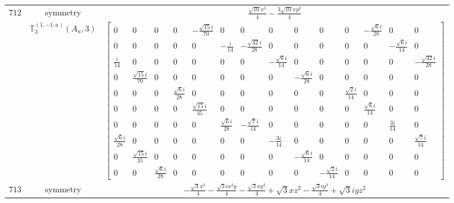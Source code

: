 \documentclass[fleqn,8pt,landscape]{jsarticle}
\begin{document}
\begin{longtable}{ccc}
$ 712 $ & $ \text{symmetry} $ & $ \frac{\sqrt{10} x^{3}}{4} - \frac{3 \sqrt{10} x y^{2}}{4} $ \\
$  $ & $ \mathbb{T}_{3}^{(1,-1;a)}(A_{u},3) $ & $ \begin{bmatrix} 0 & 0 & 0 & 0 & - \frac{\sqrt{15} i}{70} & 0 & 0 & 0 & 0 & 0 & 0 & - \frac{\sqrt{6} i}{28} & 0 & 0 \\ 0 & 0 & 0 & 0 & 0 & - \frac{i}{14} & - \frac{\sqrt{42} i}{28} & 0 & 0 & 0 & 0 & 0 & - \frac{\sqrt{6} i}{14} & 0 \\ \frac{i}{14} & 0 & 0 & 0 & 0 & 0 & 0 & - \frac{\sqrt{6} i}{14} & 0 & 0 & 0 & 0 & 0 & - \frac{\sqrt{42} i}{28} \\ 0 & \frac{\sqrt{15} i}{70} & 0 & 0 & 0 & 0 & 0 & 0 & - \frac{\sqrt{6} i}{28} & 0 & 0 & 0 & 0 & 0 \\ 0 & 0 & 0 & \frac{\sqrt{6} i}{28} & 0 & 0 & 0 & 0 & 0 & 0 & \frac{\sqrt{2} i}{14} & 0 & 0 & 0 \\ 0 & 0 & 0 & 0 & \frac{\sqrt{15} i}{35} & 0 & 0 & 0 & 0 & 0 & 0 & \frac{\sqrt{6} i}{14} & 0 & 0 \\ 0 & 0 & 0 & 0 & 0 & \frac{\sqrt{6} i}{28} & - \frac{\sqrt{7} i}{14} & 0 & 0 & 0 & 0 & 0 & \frac{3 i}{14} & 0 \\ \frac{\sqrt{6} i}{28} & 0 & 0 & 0 & 0 & 0 & 0 & - \frac{3 i}{14} & 0 & 0 & 0 & 0 & 0 & \frac{\sqrt{7} i}{14} \\ 0 & \frac{\sqrt{15} i}{35} & 0 & 0 & 0 & 0 & 0 & 0 & - \frac{\sqrt{6} i}{14} & 0 & 0 & 0 & 0 & 0 \\ 0 & 0 & \frac{\sqrt{6} i}{28} & 0 & 0 & 0 & 0 & 0 & 0 & - \frac{\sqrt{2} i}{14} & 0 & 0 & 0 & 0 \end{bmatrix} $ \\ \hline
$ 713 $ & $ \text{symmetry} $ & $ - \frac{\sqrt{3} x^{3}}{4} - \frac{\sqrt{3} i x^{2} y}{4} - \frac{\sqrt{3} x y^{2}}{4} + \sqrt{3} x z^{2} - \frac{\sqrt{3} i y^{3}}{4} + \sqrt{3} i y z^{2} $ \\

\end{longtable}
\end{document}
